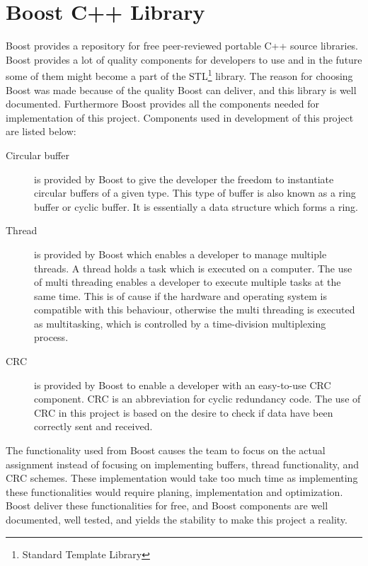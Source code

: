 \chapter{Boost C++ Library}\label{app:boost}
Boost provides a repository for free peer-reviewed portable C++ source libraries. Boost provides a lot of quality components for developers to use and in the future some of them might become a part of the STL\footnote{Standard Template Library} library. The reason for choosing Boost was made because of the quality Boost can deliver, and this library is well documented. Furthermore Boost provides all the components needed for implementation of this project. Components used in development of this project are listed below:

\begin{description}
\item[Circular buffer]
is provided by Boost to give the developer the freedom to instantiate circular buffers of a given type. This type of buffer is also known as a ring buffer or cyclic buffer. It is essentially a data structure which forms a ring. 

\item[Thread]
is provided by Boost which enables a developer to manage multiple threads. A thread holds a task which is executed on a computer. The use of multi threading enables a developer to execute multiple tasks at the same time. This is of cause if the hardware and operating system is compatible with this behaviour, otherwise the multi threading is executed as multitasking, which is controlled by a time-division multiplexing process.

\item[CRC]
is provided by Boost to enable a developer with an easy-to-use CRC component. CRC is an abbreviation for cyclic redundancy code. The use of CRC in this project is based on the desire to check if data have been correctly sent and received.
\end{description}

The functionality used from Boost causes the team to focus on the actual assignment instead of focusing on implementing buffers, thread functionality, and CRC schemes. These implementation would take too much time as implementing these functionalities would require planing, implementation and optimization. Boost deliver these functionalities for free, and Boost components are well documented, well tested, and yields the stability to make this project a reality.